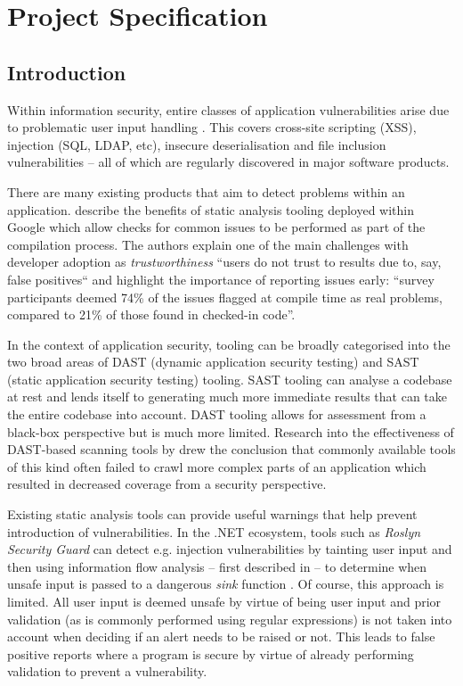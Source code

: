 \documentclass[a4paper,openany,12pt]{book}
\begin{document}



\appendix

\chapter{Project Specification}
\label{project:spec}
\section*{Introduction}

Within information security, entire classes of application vulnerabilities arise due to problematic user input handling \citep{christey2007vulnerability}.
This covers cross-site scripting (XSS), injection (SQL, LDAP, etc), insecure
deserialisation and file inclusion vulnerabilities -- all of which are regularly discovered in major software products.

There are many existing products that aim to detect problems within an application. \citet{sadowski2018lessons} describe the benefits of static analysis tooling deployed within Google which allow checks for common issues to be performed as part of the compilation process. The authors explain one of the main challenges with developer adoption as \emph{trustworthiness} ``users do not trust to results due to, say, false positives`` and highlight the importance of reporting issues early: ``survey participants deemed 74\% of the issues flagged at compile time as real problems, compared to 21\% of those found in checked-in code''.

In the context of application security, tooling can be broadly categorised into the two broad areas of DAST (dynamic application security testing) and SAST (static application security testing) tooling. SAST tooling can analyse a codebase at rest and lends itself to generating much more immediate results that can take the entire codebase into account. DAST tooling allows for assessment from a black-box perspective but is much more limited. Research into the effectiveness of DAST-based scanning tools by \citet{doupe2010johnny} drew the conclusion that commonly available tools of this kind often failed to crawl more complex parts of an application which resulted in decreased coverage from a security perspective.

Existing static analysis tools can provide useful warnings that help prevent introduction of vulnerabilities.
In the .NET ecosystem, tools such as \emph{Roslyn Security Guard} can detect e.g. injection vulnerabilities by tainting
user input and then using information flow analysis -- first described in \cite{denning1977certification} -- to
determine when unsafe input is passed to a dangerous \emph{sink} function \citep{rosylynsecguard}.
Of course, this approach is limited.
All user input is deemed unsafe by virtue of being user input and prior validation (as is commonly performed using
regular expressions) is not taken into account when deciding if an alert needs to be raised or not.
This leads to false positive reports where a program is secure by virtue of already performing validation to prevent a
vulnerability.
\end{document}
